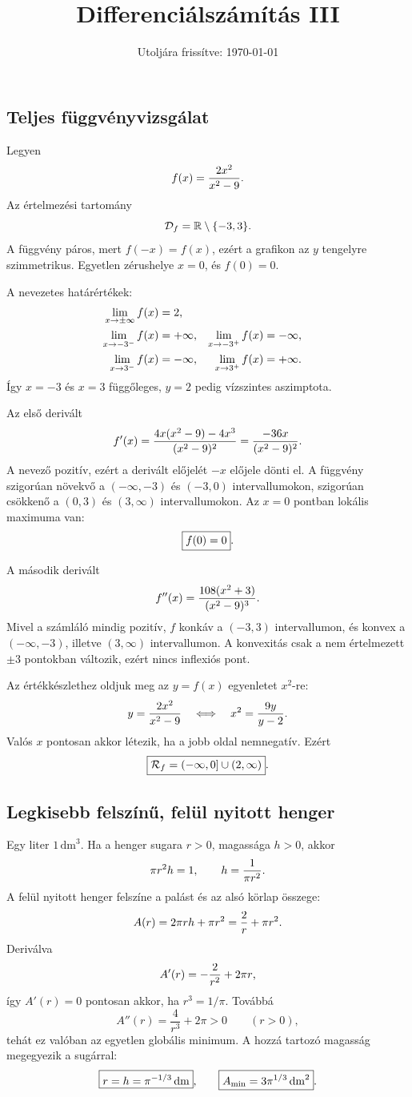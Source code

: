 \documentclass{szb-solution}
\title{Differenciálszámítás III}
\date{Utoljára frissítve: \today}
\begin{document}
\maketitle

\subsection{Teljes függvényvizsgálat}

Legyen
$$
  f(x)=\frac{2x^2}{x^2-9}
  \text.
$$
Az értelmezési tartomány
$$
  \mathcal{D}_f=\mathbb R\setminus\{-3,3\}
  \text.
$$
A függvény páros, mert $f(-x)=f(x)$, ezért a grafikon az $y$ tengelyre
szimmetrikus. Egyetlen zérushelye $x=0$, és $f(0)=0$.

A nevezetes határértékek:
\begin{align*}
  \lim_{x\to\pm\infty}f(x)&=2,\\
  \lim_{x\to-3^-}f(x)&=+\infty,
  &\lim_{x\to-3^+}f(x)&=-\infty,\\
  \lim_{x\to3^-}f(x)&=-\infty,
  &\lim_{x\to3^+}f(x)&=+\infty
  \text.
\end{align*}
Így $x=-3$ és $x=3$ függőleges, $y=2$ pedig vízszintes
aszimptota.

Az első derivált
$$
  f'(x)=\frac{4x(x^2-9)-4x^3}{(x^2-9)^2}
       =\frac{-36x}{(x^2-9)^2}
  \text.
$$
A nevező pozitív, ezért a derivált előjelét $-x$ előjele dönti el. A
függvény szigorúan növekvő a $(-\infty,-3)$ és $(-3,0)$ intervallumokon,
szigorúan csökkenő a $(0,3)$ és $(3,\infty)$ intervallumokon. Az
$x=0$ pontban lokális maximuma van:
$$
  \boxed{f(0)=0}
  \text.
$$

A második derivált
$$
  f''(x)=\frac{108(x^2+3)}{(x^2-9)^3}
  \text.
$$
Mivel a számláló mindig pozitív, $f$ konkáv a $(-3,3)$ intervallumon,
és konvex a $(-\infty,-3)$, illetve $(3,\infty)$ intervallumon. A
konvexitás csak a nem értelmezett $\pm3$ pontokban változik, ezért nincs
inflexiós pont.

Az értékkészlethez oldjuk meg az $y=f(x)$ egyenletet $x^2$-re:
$$
  y=\frac{2x^2}{x^2-9}
  \quad\Longleftrightarrow\quad
  x^2=\frac{9y}{y-2}
  \text.
$$
Valós $x$ pontosan akkor létezik, ha a jobb oldal nemnegatív. Ezért
$$
  \boxed{\mathcal{R}_f=(-\infty,0]\cup(2,\infty)}
  \text.
$$

\subsection{Legkisebb felszínű, felül nyitott henger}

Egy liter $1\,\mathrm{dm}^3$. Ha a henger sugara $r>0$, magassága $h>0$,
akkor
$$
  \pi r^2h=1,
  \qquad
  h=\frac{1}{\pi r^2}
  \text.
$$
A felül nyitott henger felszíne a palást és az alsó körlap összege:
$$
  A(r)=2\pi rh+\pi r^2=\frac{2}{r}+\pi r^2
  \text.
$$
Deriválva
$$
  A'(r)=-\frac{2}{r^2}+2\pi r
  \text,
$$
így $A'(r)=0$ pontosan akkor, ha $r^3=1/\pi$. Továbbá
$$
  A''(r)=\frac{4}{r^3}+2\pi>0
  \qquad(r>0),
$$
tehát ez valóban az egyetlen globális minimum. A hozzá tartozó magasság
megegyezik a sugárral:
$$
  \boxed{r=h=\pi^{-1/3}\,\mathrm{dm}}
  \text,
  \qquad
  \boxed{A_{\min}=3\pi^{1/3}\,\mathrm{dm}^2}
  \text.
$$
\end{document}
